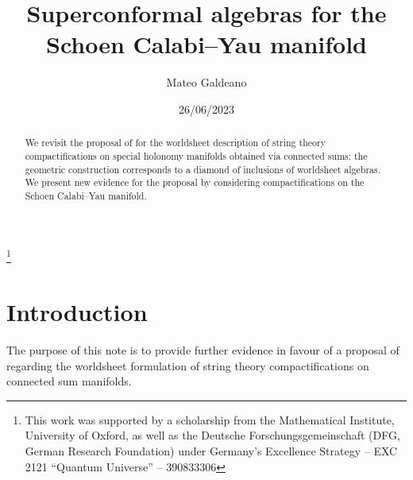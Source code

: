 \documentclass{pspum-l}
\theoremstyle{definition}
\theoremstyle{remark}
\numberwithin{equation}{section}
\begin{document}
\title[Superconformal algebras for the Schoen Calabi--Yau manifold]{Superconformal algebras for the\\
Schoen Calabi--Yau manifold}


\author{Mateo Galdeano}
\address{Fachbereich Mathematik, Universit\"at Hamburg, Bundesstra{\ss}e 55, 20146, Hamburg, Germany}
\thanks{This work was supported by a scholarship from the Mathematical Institute, University of Oxford, as well as the Deutsche Forschungsgemeinschaft (DFG, German Research Foundation) under Germany’s Excellence Strategy – EXC 2121 ``Quantum Universe'' – 390833306}



\date{26/06/2023}

\begin{abstract}
We revisit the proposal of \cite{Fiset:2021ruv} for the worldsheet description of string theory compactifications on special holonomy manifolds obtained via connected sums: the geometric construction corresponds to a diamond of inclusions of worldsheet algebras. We present new  evidence for the proposal by considering compactifications on the Schoen Calabi--Yau manifold.
\end{abstract}

\maketitle



\tableofcontents

\section{Introduction}

The purpose of this note is to provide further evidence in favour of a proposal of \cite{Fiset:2021ruv} regarding the worldsheet formulation of string theory compactifications on connected sum manifolds.
\end{document}
